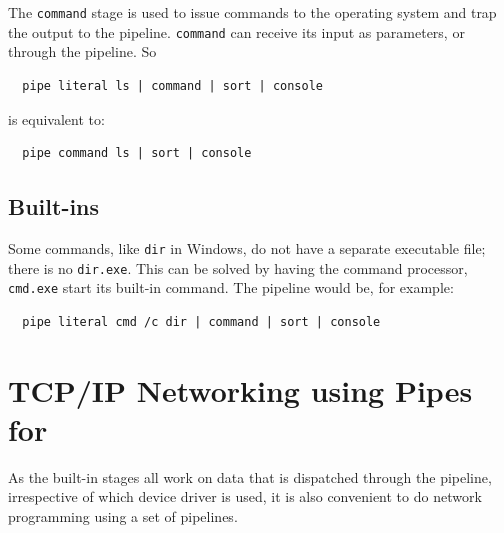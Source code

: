 The \texttt{command} stage is used to issue commands to the operating
system and trap the output to the pipeline. \texttt{command} can
receive its input as parameters, or through the pipeline. So
\begin{lstlisting}
  pipe literal ls | command | sort | console
\end{lstlisting}
is equivalent to:
\begin{lstlisting}
  pipe command ls | sort | console
\end{lstlisting}


\section{Built-ins}
Some commands, like \texttt{dir} in Windows, do not have a separate
executable file; there is no \texttt{dir.exe}. This can be solved by
having the command processor, \texttt{cmd.exe} start its built-in
command. The pipeline would be, for example:
\begin{lstlisting}
  pipe literal cmd /c dir | command | sort | console
\end{lstlisting}
\chapter{TCP/IP Networking using Pipes for \nr{}}
As the built-in stages all work on data that is dispatched through the
pipeline, irrespective of which device driver is used, it is also
convenient to do network programming using a set of pipelines.

